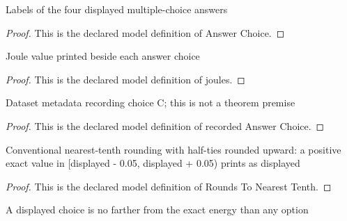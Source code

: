 \begin{definition}
  \label{def:physics:phyx-mini-0275:phyxminiproblems-problemphyxmini0275-answerchoice}
  Labels of the four displayed multiple-choice answers
\end{definition}
\begin{proof}
  This is the declared model definition of Answer Choice.
\end{proof}
\begin{definition}[joules]
  \label{def:physics:phyx-mini-0275:phyxminiproblems-problemphyxmini0275-answerchoice-joules}
  Joule value printed beside each answer choice
\end{definition}
\begin{proof}
  This is the declared model definition of joules.
\end{proof}
\begin{definition}
  \label{def:physics:phyx-mini-0275:phyxminiproblems-problemphyxmini0275-recordedanswerchoice}
  Dataset metadata recording choice C; this is not a theorem premise
\end{definition}
\begin{proof}
  This is the declared model definition of recorded Answer Choice.
\end{proof}
\begin{definition}
  \label{def:physics:phyx-mini-0275:phyxminiproblems-problemphyxmini0275-roundstonearesttenth}
  Conventional nearest-tenth rounding with half-ties rounded upward: a positive exact value in [displayed - 0.05, displayed + 0.05) prints as displayed
\end{definition}
\begin{proof}
  This is the declared model definition of Rounds To Nearest Tenth.
\end{proof}
\begin{definition}
  \label{def:physics:phyx-mini-0275:phyxminiproblems-problemphyxmini0275-isclosestdisplayedanswer}
  A displayed choice is no farther from the exact energy than any option
\end{definition}
